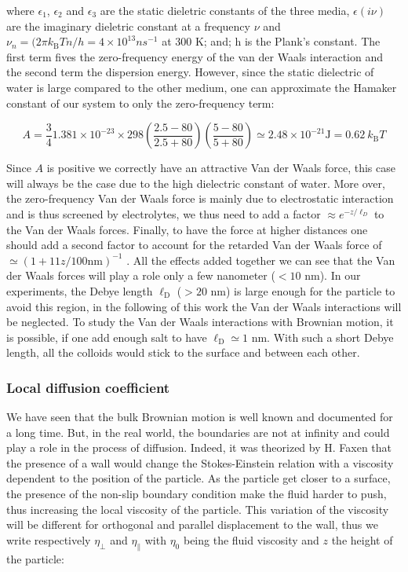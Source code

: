 where $\epsilon_1$, $\epsilon_2$ and $\epsilon_3$ are the static dieletric constants of the three media, $\epsilon (i\nu)$ are the imaginary dieletric constant at a frequency $\nu$ and $\nu_n = (2 \pi k_\mathrm{B}Tn/h = 4 \times 10^{13} n s^{-1}$ at $300$ K; and; h is the Plank's constant. The first term fives the zero-frequency energy of the van der Waals interaction and the second term the dispersion energy.
However, since the static dielectric of water is large compared to the other medium, one can approximate the Hamaker constant of our system to only the zero-frequency term:

\begin{equation}
	A = \frac{3}{4} 1.381 \times 10^{-23} \times 298 
	\left(
	\frac{2.5 - 80}{2.5 + 80}
	\right)
	\left(
	\frac{5 - 80}{5 + 80}
	\right)
	\simeq
	2.48 \times 10^{-21} \mathrm{J}	= 0.62 ~ k_\mathrm{B}T
\end{equation}

Since $A$ is positive we correctly have an attractive Van der Waals force, this case will always be the case due to the high dielectric constant of water. More over, the zero-frequency Van der Waals force is mainly due to electrostatic interaction and is thus screened by electrolytes, we thus need to add a factor $\approx e^{-z/\ell_D}$ to the Van der Waals forces. Finally, to have the force at higher distances one should add a second factor to account for the retarded Van der Waals force of $ \simeq (1  + 11z/100 \mathrm{nm})^{-1}$ \cite{israelachvili_intermolecular_2015}. All the effects added together we can see that the Van der Waals forces will play a role only a few nanometer ($< 10$ nm). In our experiments, the Debye length $\ell _\mathrm{D}$ ($>20$ nm) is large enough for the particle to avoid this region, in the following of this work the Van der Waals interactions will be neglected. To study the Van der Waals interactions with Brownian motion, it is possible, if one add enough salt to have $\ell_\mathrm{D} \simeq 1$ nm. With such a short Debye length, all the colloids would stick to the surface and between each other.

\subsubsection{Local diffusion coefficient}



We have seen that the bulk Brownian motion is well known and documented for a long time. But, in the real world, the boundaries are not at infinity and could play a role in the process of diffusion. Indeed, it was theorized by H. Faxen \cite{faxen_fredholm_1924} that the presence of a wall would change the Stokes-Einstein relation with a viscosity dependent to the position of the particle. As the particle get closer to a surface, the presence of the non-slip boundary condition make the fluid harder to push, thus increasing the local viscosity of the particle. This variation of the viscosity will be different for orthogonal and parallel displacement to the wall, thus we write respectively $\eta_\bot $ and $\eta_\parallel$ with $\eta_0$ being the fluid viscosity and $z$ the height of the particle:


